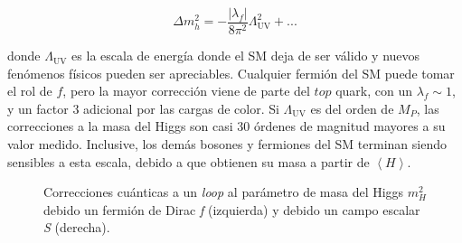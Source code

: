 \begin{equation}
	\Delta m_h^2 = - \frac{|\lambda_f|}{8 \pi^2}\Lambda_{\text{UV}}^2 + ...
\end{equation}

\noindent
donde $\Lambda_{\text{UV}}$ es la escala de energía donde el SM deja de ser válido y nuevos fenómenos físicos pueden ser apreciables. Cualquier fermión del SM puede tomar el rol de $f$, pero la mayor corrección viene de parte del $top$ quark, con un $\lambda_f\sim1$, y un factor $3$ adicional por las cargas de color. Si $\Lambda_{\text{UV}}$ es del orden de $M_P$, las correcciones a la masa del Higgs son casi 30 órdenes de magnitud mayores a su valor medido. 
Inclusive, los demás bosones y fermiones del SM terminan siendo sensibles a esta escala, debido a que obtienen su masa a partir de $\left<H\right>$.

\begin{figure}
\centering

	\begin{subfigure}{0.45\textwidth}
	\end{subfigure}
	\hfill
	\begin{subfigure}{0.45\textwidth}
	\end{subfigure}

\caption{Correcciones cuánticas a un \textit{loop} al parámetro de masa del Higgs $m_{H}^{2}$ debido un fermión de Dirac \textit{f} (izquierda) y debido un campo escalar \textit{S} (derecha).}
\label{fig:loops}
\end{figure}

